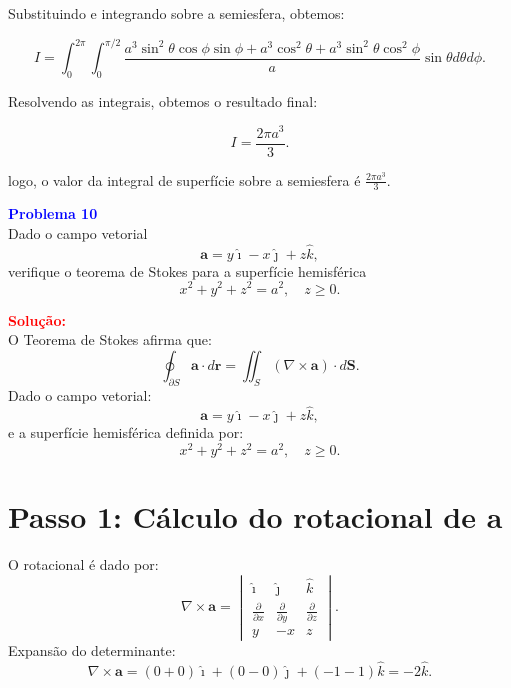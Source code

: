 \documentclass[a4paper,12pt]{article}
\begin{document}
\begin{flushleft}
Substituindo e integrando sobre a semiesfera, obtemos:

\begin{equation}
I = \int_0^{2\pi} \int_0^{\pi/2} \frac{a^3 \sin^2 \theta \cos \phi \sin \phi + a^3 \cos^2 \theta + a^3 \sin^2 \theta \cos^2 \phi}{a} \sin \theta d\theta d\phi.
\end{equation}

Resolvendo as integrais, obtemos o resultado final:

\begin{equation}
I = \frac{2\pi a^3}{3}.
\end{equation}

logo, o valor da integral de superfície sobre a semiesfera é $\frac{2\pi a^3}{3}$.
\end{flushleft}

\begin{flushleft}
\textbf{\textcolor{blue}{\Large Problema 10}}\\
Dado o campo vetorial  
\[
\mathbf{a} = y\hat{\imath} - x\hat{\jmath} + z\hat{k},
\]
verifique o teorema de Stokes para a superfície hemisférica  
\[
x^2 + y^2 + z^2 = a^2, \quad z \geq 0.
\]

\textcolor{red}{\textbf{Solução:}}\\

O Teorema de Stokes afirma que:
\begin{equation}
    \oint_{\partial S} \mathbf{a} \cdot d\mathbf{r} = \iint_{S} (\nabla \times \mathbf{a}) \cdot d\mathbf{S}.
\end{equation}
Dado o campo vetorial:
\begin{equation}
    \mathbf{a} = y\hat{\imath} - x\hat{\jmath} + z\hat{k},
\end{equation}
e a superfície hemisférica definida por:
\begin{equation}
    x^2 + y^2 + z^2 = a^2, \quad z \geq 0.
\end{equation}

\section*{Passo 1: Cálculo do rotacional de $\mathbf{a}$}
O rotacional é dado por:
\begin{equation}
    \nabla \times \mathbf{a} =
    \begin{vmatrix} 
    \hat{\imath} & \hat{\jmath} & \hat{k} \\
    \frac{\partial}{\partial x} & \frac{\partial}{\partial y} & \frac{\partial}{\partial z} \\
    y & -x & z
    \end{vmatrix}.
\end{equation}
Expansão do determinante:
\begin{equation}
    \nabla \times \mathbf{a} = (0 + 0)\hat{\imath} + (0 - 0)\hat{\jmath} + (-1 - 1)\hat{k} = -2\hat{k}.
\end{equation}


\end{flushleft}
\end{document}
